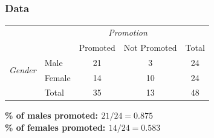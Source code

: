 \documentclass[slidestop,compress,mathserif]{beamer}
\newcommand{\soln}[1]{\textit{#1}}
\begin{document}

\begin{frame}
\frametitle{Data}


\begin{center}
\begin{tabular}{ll  cc c} 
  		&				& \multicolumn{2}{c}{\textit{Promotion}} \\
\cline{3-4}
							&			& Promoted	& Not Promoted 	& Total	\\
\cline{2-5}
\multirow{2}{*}{\textit{Gender	}}	&Male 		& 21	 	& 3		& 24 	\\
							&Female		& 14	 	& 10 	 	& 24 \\
\cline{2-5}
							&Total		& 35		& 13		& 48 \\
\end{tabular}
\end{center}

\pause

\textbf{\% of males promoted: $21 / 24 = 0.875$} \\
\textbf{\% of females promoted: $14 / 24 = 0.583$}

\end{frame}







\end{document}
